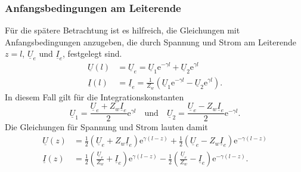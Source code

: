 \documentclass[paper=a4, parskip=half-, ngerman, fontsize=11pt]{scrreprt}
\begin{document}
\subsubsection{Anfangsbedingungen am Leiterende}

Für die spätere Betrachtung ist es hilfreich, die Gleichungen mit Anfangsbedingungen anzugeben, die durch Spannung und
Strom am Leiterende $z=l$, $\underline{U}_{e}$ und $\underline{I}_{e}$, festgelegt sind.
\begin{align*}
    \underline{U}(l) &= \underline{U}_{e} = \underline{U}_{1} \mathrm{e}^{- \gamma l}
    +
    \underline{U}_{2} \mathrm{e}^{ \gamma l} \\[1ex]
    \underline{I}(l) &= \underline{I}_{e} = \frac{1}{Z_{w}}
    \left(
    \underline{U}_{1} \mathrm{e}^{- \gamma l}
    -
    \underline{U}_{2} \mathrm{e}^{ \gamma l}
    \right).
\end{align*}
In diesem Fall gilt für die Integrationskonstanten
\[ \underline{U}_{1} = \frac{\underline{U}_{e} + Z_{w} \underline{I}_{e}}{2} \mathrm{e}^{\gamma l} \quad \text{und}
\quad \underline{U}_{2} = \frac{\underline{U}_{e} - Z_{w} \underline{I}_{e}}{2} \mathrm{e}^{- \gamma l}. \]
Die Gleichungen für Spannung und Strom lauten damit
\begin{align}
    \underline{U}(z) &=
    \frac{1}{2} \left( \underline{U}_{e} + Z_{w} \underline{I}_{e} \right) \mathrm{e}^{\gamma (l - z)}
    +
    \frac{1}{2} \left( \underline{U}_{e} - Z_{w} \underline{I}_{e} \right) \mathrm{e}^{- \gamma (l - z)} \label{eq:UxE}
    \\[1ex]
    \underline{I}(z) &=
    \frac{1}{2} \left( \frac{\underline{U}_{e}}{Z_{w}} + \underline{I}_{e} \right) \mathrm{e}^{\gamma (l - z)}
    -
    \frac{1}{2} \left( \frac{\underline{U}_{e}}{Z_{w}} - \underline{I}_{e} \right) \mathrm{e}^{- \gamma (l - z)}
    \label{eq:IxE} .
\end{align}
\end{document}

